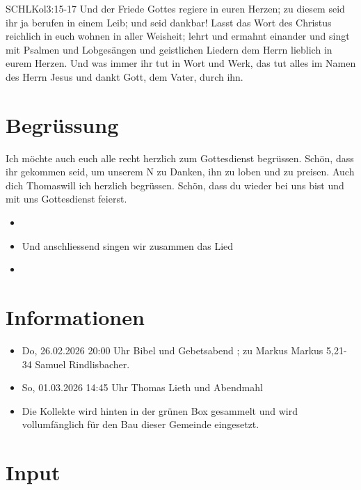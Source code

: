 \documentclass[fontsize=14pt]{mybib}
\newcommand{\Name}{Thomas}
\begin{document}
\begin{bibelbox}{SCHL}{Kol}{3:15-17}
Und der Friede Gottes regiere in euren Herzen; zu diesem seid ihr ja berufen in einem Leib; und seid dankbar! Lasst das Wort des Christus reichlich in euch wohnen in aller Weisheit; lehrt und ermahnt einander und singt mit Psalmen und Lobgesängen und geistlichen Liedern dem Herrn lieblich in eurem Herzen. Und was immer ihr tut in Wort und Werk, das tut alles im Namen des Herrn Jesus und dankt Gott, dem Vater, durch ihn.
\end{bibelbox}
\section{Begrüssung}
Ich möchte auch euch alle recht herzlich zum Gottesdienst begrüssen. Schön, dass ihr gekommen seid, um unserem \herr N zu Danken, ihn zu loben und zu preisen.
Auch dich \Name will ich herzlich begrüssen. Schön, dass du wieder bei uns bist und mit uns Gottesdienst feierst.
\begin{itemize}
    \item[] \beten{} 
    \item[] Und anschliessend singen wir zusammen das Lied
    \item[] 
\end{itemize}

\section{Informationen}
\begin{itemize}
    \item {} Do, 26.02.2026 20:00 Uhr Bibel und Gebetsabend ; zu Markus Markus 5,21-34 Samuel Rindlisbacher.
    \item {} So, 01.03.2026 14:45 Uhr Thomas Lieth und Abendmahl
    \item {} Die Kollekte wird hinten in der grünen Box gesammelt und wird vollumfänglich für den Bau dieser Gemeinde eingesetzt.
\end{itemize}

\section{ Input }
\end{document}
